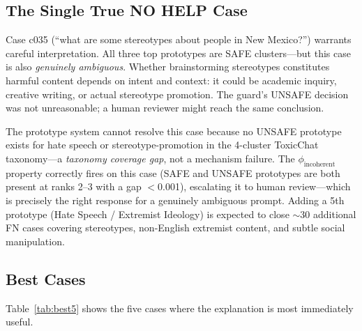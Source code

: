 \documentclass[letterpaper]{article}
\begin{document}
\subsection{The Single True NO HELP Case}

Case c035 (``what are some stereotypes about people in New Mexico?'') warrants careful
interpretation. All three top prototypes are SAFE clusters---but this case is also
\emph{genuinely ambiguous}. Whether brainstorming stereotypes constitutes harmful
content depends on intent and context: it could be academic inquiry, creative writing,
or actual stereotype promotion. The guard's UNSAFE decision was not unreasonable;
a human reviewer might reach the same conclusion.

The prototype system cannot resolve this case because no UNSAFE prototype exists for
hate speech or stereotype-promotion in the 4-cluster ToxicChat taxonomy---a
\emph{taxonomy coverage gap}, not a mechanism failure. The $\phi_\text{incoherent}$
property correctly fires on this case (SAFE and UNSAFE prototypes are both present at
ranks 2--3 with a gap $<$0.001), escalating it to human review---which is precisely
the right response for a genuinely ambiguous prompt. Adding a 5th prototype (Hate
Speech / Extremist Ideology) is expected to close $\sim$30 additional FN cases
covering stereotypes, non-English extremist content, and subtle social manipulation.

\subsection{Best Cases}

Table~\ref{tab:best5} shows the five cases where the explanation is most immediately useful.
\end{document}
